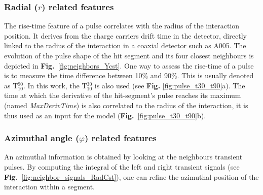 \subsubsection{Radial ($r$) related features}
The rise-time feature of a pulse correlates with the radius of the interaction position. It derives from the charge carriers drift time in the detector, directly linked to the radius of the interaction in a coaxial detector such as A005. The evolution of the pulse shape of the hit segment and its four closest neighbours is depicted in \textbf{Fig.}~\ref{fig:neighbors_Ycst}. One way to assess the rise-time of a pulse is to measure the time difference between 10\% and 90\%. This is usually denoted as T$^{90}_{10}$. In this work, the T$^{30}_{10}$ is also used (see \textbf{Fig.} \ref{fig:pulse_t30_t90}a).
The time at which the derivative of the hit-segment's pulse reaches its maximum (named \textit{MaxDerivTime}) is also correlated to the radius of the interaction, it is thus used as an input for the model (\textbf{Fig.}~\ref{fig:pulse_t30_t90}b).

\subsubsection{Azimuthal angle ($\varphi$) related features}
An azimuthal information is obtained by looking at the neighbours transient pulses. By computing the integral of the left and right transient signals (see \textbf{Fig.}~\ref{fig:neighbor_signals_RadCst}), one can refine the azimuthal position of the interaction within a segment.

